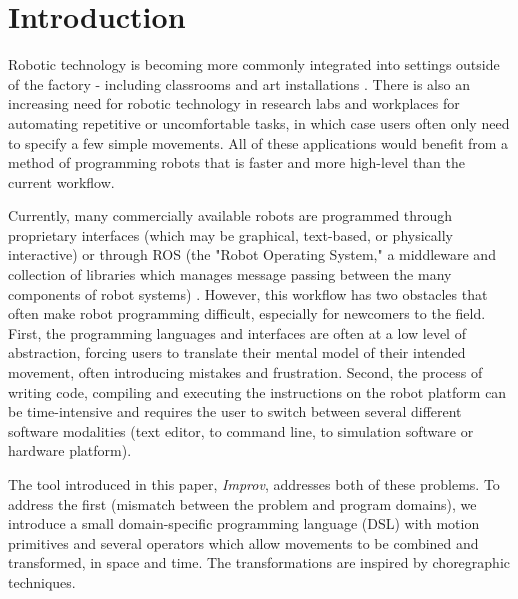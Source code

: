 \documentclass[sigconf]{acmart}
\begin{document}
%
%



\maketitle


\section{Introduction}\label{introduction}

Robotic technology is becoming more commonly integrated into settings outside of
the factory - including classrooms \cite{mataric2004robotics} and art installations
\cite{kukaDance2017}. There
is also an increasing need for robotic technology in research labs and
workplaces for automating repetitive or uncomfortable tasks, in which case
users often only need to specify a few simple movements. All of
these applications would benefit from a method of programming robots that is
faster and more high-level than the current workflow.


Currently, many commercially available robots are programmed through proprietary
interfaces (which may be graphical, text-based, or physically interactive) or through ROS (the "Robot Operating System,"
a middleware and collection of libraries which manages message passing between
the many components of robot systems) \cite{rossano2013easy}
\cite{quigley2009ros}. However, this
workflow has two obstacles that often make robot programming difficult,
especially for newcomers to the field. First, the programming languages and
interfaces are
often at a low level of abstraction, forcing users to translate their
mental model of their intended movement, often introducing
mistakes and frustration. Second, the process of writing code, compiling and
executing the instructions on the robot platform can be time-intensive and
requires the user to switch between several different software modalities (text
editor, to command line, to simulation software or hardware platform).

The tool introduced in this paper, \emph{Improv}, addresses both of these
problems. To address the first (mismatch between the problem and
program domains), we introduce a small domain-specific programming language
(DSL) with motion primitives and several operators which allow
movements to be combined and transformed, in space and time. The transformations
are inspired by choregraphic techniques. 
\end{document}
